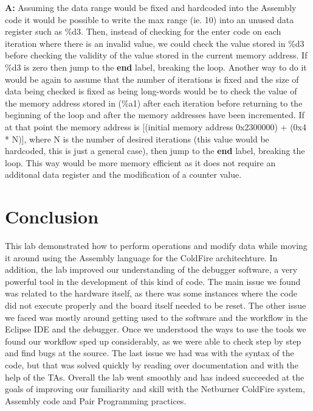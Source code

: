 \documentclass[letterpaper]{article}
\begin{document}
      \noindent\textbf{A:}
        Assuming the data range would be fixed and hardcoded into the Assembly code it would be possible to
        write the max range (ie. 10) into an unused data register such as \%d3.  Then, instead of checking
        for the enter code on each iteration where there is an invalid value, we could check the value stored in
        \%d3 before checking the validity of the value stored in the current memory address.  If \%d3 is
        zero then jump to the \textbf{end} label, breaking the loop.  Another way to do it would be again
        to assume that the number of iterations is fixed and the size of data being checked is fixed as being
        long-words would be to check the value of the memory address stored in (\%a1) after each iteration
        before returning to the beginning of the loop and after the memory addresses have been incremented.
        If at that point the memory address is [(initial memory address 0x2300000) + (0x4 * N)], where N is
        the number of desired iterations (this value would be hardcoded, this is just a general case), then
        jump to the \textbf{end} label, breaking the loop.  This way would be more memory efficient as it
        does not require an additonal data register and the modification of a counter value.

\section{Conclusion}
  This lab demonstrated how to perform operations
  and modify data while moving it around using the Assembly language for the ColdFire architechture.
  In addition, the lab improved our understanding of the debugger software, a very powerful
  tool in the development of this kind of code.  The main issue we found was related
  to the hardware itself, as there was some instances where the code did not execute
  properly and the board itself needed to be reset.  The other issue we faced was mostly
  around getting used to the software and the workflow in the Eclipse IDE and
  the debugger.  Once we understood the ways to use the tools we found our workflow sped up
  considerably, as we were able to check step by step and find bugs at the source.  The last
  issue we had was with the syntax of the code, but that was solved quickly by reading over
  documentation and with the help of the TAs.  Overall the lab went smoothly and has indeed
  succeeded at the goals of improving our familiarity and skill with the Netburner ColdFire system,
  Assembly code and Pair Programming practices.
\end{document}
